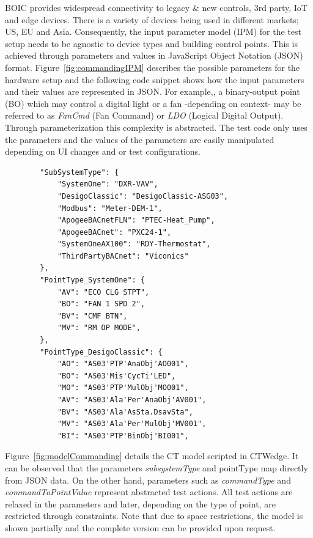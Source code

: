 \documentclass[conference]{IEEEtran}
\begin{document}
	BOIC provides widespread connectivity to legacy \& new controls, 3rd party, IoT and edge devices. There is a variety of devices being used in different markets; US, EU and Asia. 
	Consequently, the input parameter model (IPM) for the test setup needs to be agnostic to device types and building control points.
	This is achieved through parameters and values in JavaScript Object Notation (JSON) format.
	Figure~\ref{fig:commandingIPM} describes the possible parameters for the hardware setup and the following code snippet shows how the input parameters and their values are represented in JSON. 
	For example,, a binary-output point (BO) which may control a digital light or a fan -depending on context- may be referred to as \textit{FanCmd} (Fan Command) or \textit{LDO} (Logical Digital Output).
  Through parameterization this complexity is abstracted. The test code only uses the parameters and the values of the parameters are easily manipulated depending on UI changes and or test configurations.

	\begin{lstlisting}
		"SubSystemType": {
			"SystemOne": "DXR-VAV",
			"DesigoClassic": "DesigoClassic-ASG03",
			"Modbus": "Meter-DEM-1",
			"ApogeeBACnetFLN": "PTEC-Heat_Pump",
			"ApogeeBACnet": "PXC24-1",
			"SystemOneAX100": "RDY-Thermostat",
			"ThirdPartyBACnet": "Viconics"
		},
		"PointType_SystemOne": {
			"AV": "ECO CLG STPT",
			"BO": "FAN 1 SPD 2",
			"BV": "CMF BTN",
			"MV": "RM OP MODE",
		},
		"PointType_DesigoClassic": {
			"AO": "AS03'PTP'AnaObj'AO001",
			"BO": "AS03'Mis'CycTi'LED",
			"MO": "AS03'PTP'MulObj'MO001",
			"AV": "AS03'Ala'Per'AnaObj'AV001",
			"BV": "AS03'Ala'AsSta.DsavSta",
			"MV": "AS03'Ala'Per'MulObj'MV001",
			"BI": "AS03'PTP'BinObj'BI001",	
	\end{lstlisting}

	
	Figure~\ref{fig:modelCommanding} details the CT model scripted in CTWedge.
	It can be observed that the parameters \emph{subsystemType} and \emph{}{pointType} map directly from JSON data.
	On the other hand, parameters such as \emph{commandType} and \emph{commandToPointValue} represent abstracted test actions.
	All test actions are relaxed in the parameters and later, depending on the type of point, are restricted through constraints.
	Note that due to space restrictions, the model is shown partially and the complete version can be provided upon request.
	
\end{document}
